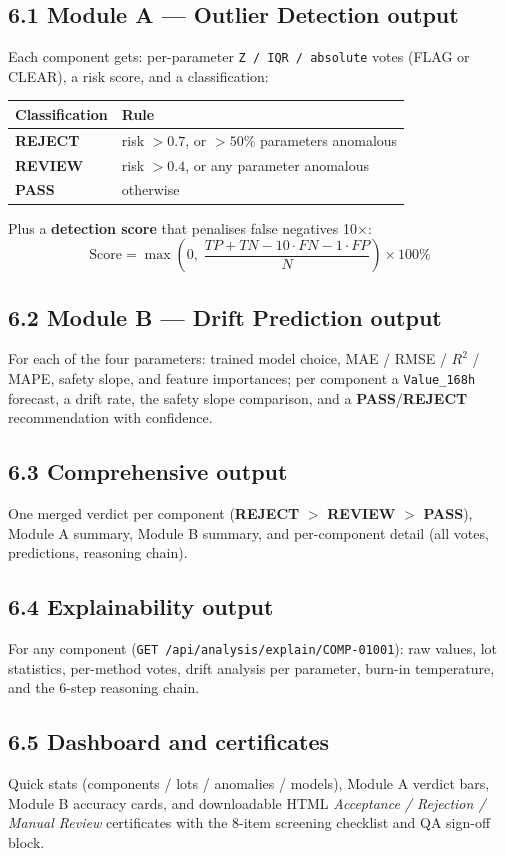 \documentclass[11pt,a4paper]{article}
\newcommand{\code}[1]{\texttt{\small #1}}
\newcommand{\keys}[1]{\textbf{\sffamily#1}}
\begin{document}
\subsection*{6.1 Module A --- Outlier Detection output}
Each component gets: per-parameter \code{Z / IQR / absolute} votes (FLAG or CLEAR), a risk score,
and a classification:
\begin{center}
\begin{tabular}{@{}ll@{}}
\toprule
\textbf{Classification} & \textbf{Rule}\\
\midrule
\keys{REJECT} & risk $> 0.7$, or $> 50\%$ parameters anomalous\\
\keys{REVIEW} & risk $> 0.4$, or any parameter anomalous\\
\keys{PASS} & otherwise\\
\bottomrule
\end{tabular}
\end{center}
Plus a \textbf{detection score} that penalises false negatives 10$\times$:
\[
\text{Score}=\max\!\left(0,\;\frac{TP+TN-10\cdot FN-1\cdot FP}{N}\right)\times100\%
\]

\subsection*{6.2 Module B --- Drift Prediction output}
For each of the four parameters: trained model choice, MAE / RMSE / $R^2$ / MAPE, safety slope, and
feature importances; per component a \code{Value\_168h} forecast, a drift rate, the safety slope
comparison, and a \keys{PASS}/\keys{REJECT} recommendation with confidence.

\subsection*{6.3 Comprehensive output}
One merged verdict per component (\keys{REJECT} $>$ \keys{REVIEW} $>$ \keys{PASS}), Module A
summary, Module B summary, and per-component detail (all votes, predictions, reasoning chain).

\subsection*{6.4 Explainability output}
For any component (\code{GET /api/analysis/explain/COMP-01001}): raw values, lot statistics,
per-method votes, drift analysis per parameter, burn-in temperature, and the 6-step reasoning
chain.

\subsection*{6.5 Dashboard and certificates}
Quick stats (components / lots / anomalies / models), Module A verdict bars, Module B accuracy
cards, and downloadable HTML \emph{Acceptance / Rejection / Manual Review} certificates with the
8-item screening checklist and QA sign-off block.
\end{document}
